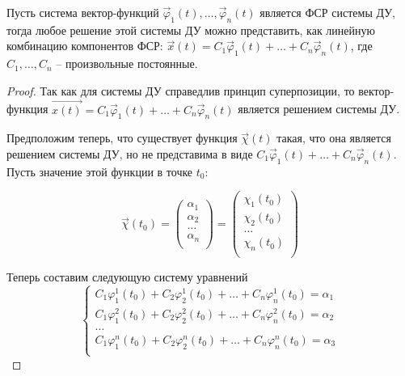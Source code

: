 \begin{theorem}
    Пусть система вектор-функций $\vec \varphi_1(t), \dots, \vec \varphi_n(t)$ является ФСР системы ДУ, тогда
    любое решение этой системы ДУ можно представить, как линейную комбинацию компонентов ФСР: 
    $\vec x(t) = C_1 \vec \varphi_1(t) + \dots + C_n \vec \varphi_n(t)$, где $C_1, \dots, C_n$ -- произвольные постоянные.
\end{theorem}
\begin{proof}
    Так как для системы ДУ справедлив принцип суперпозиции, то вектор-функция $\vec{x(t)} = C_1 \vec \varphi_1(t) + \dots + C_n \vec \varphi_n(t)$ является решением системы ДУ.
    
    Предположим теперь, что существует функция $\vec{\chi}(t)$ такая, что она является решением системы ДУ, но не представима в виде $C_1 \vec \varphi_1(t) + \dots + C_n \vec \varphi_n(t)$. Пусть значение этой функции в точке $t_0$:
    
    \begin{equation}
        \vec{\chi}(t_0) = 
        \begin{pmatrix}
            \alpha_1 \\
            \alpha_2 \\
            \dots \\
            \alpha_n \\
        \end{pmatrix} = 
        \begin{pmatrix}
            \chi_1(t_0) \\
            \chi_2(t_0) \\
            \dots \\
            \chi_n(t_0) \\
        \end{pmatrix}
    \end{equation}
    
    Теперь составим следующую систему уравнений
    \begin{equation}
        \begin{cases}
            C_1 \varphi_1^1(t_0) + C_2 \varphi_2^1(t_0) + \dots + C_n \varphi_n^1(t_0) = \alpha_1 \\
            C_1 \varphi_1^2(t_0) + C_2 \varphi_2^2(t_0) + \dots + C_n \varphi_n^2(t_0) = \alpha_2 \\
            \dots \\
            C_1 \varphi_1^n(t_0) + C_2 \varphi_2^n(t_0) + \dots + C_n \varphi_n^n(t_0) = \alpha_3 \\
        \end{cases}
    \end{equation}
    

\end{proof}
